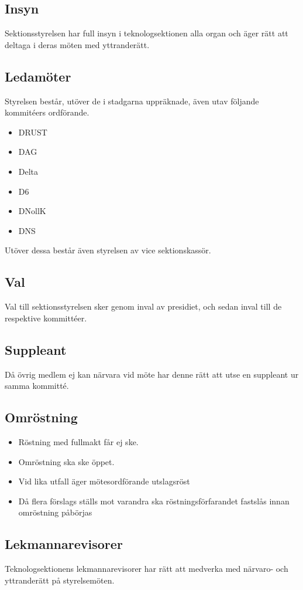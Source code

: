 \subsection{Insyn} 

Sektionsstyrelsen har full insyn i teknologsektionen alla organ och äger rätt att deltaga i deras möten med yttranderätt. 

\subsection{Ledamöter}
Styrelsen består, utöver de i stadgarna uppräknade, även utav följande kommitéers ordförande. 
\begin{itemize}
  \item DRUST 
  \item DAG 
  \item Delta 
  \item D6 
  \item DNollK
  \item DNS
\end{itemize}

Utöver dessa består även styrelsen av vice sektionskassör.

\subsection{Val}
Val till sektionsstyrelsen sker genom inval av presidiet, och sedan inval till de respektive kommittéer.

\subsection{Suppleant}
Då övrig medlem ej kan närvara vid möte har denne rätt att utse en suppleant ur samma kommitté.

\subsection{Omröstning} 

\begin{itemize}
  \item Röstning med fullmakt får ej ske. 
  \item Omröstning ska ske öppet.
  \item Vid lika utfall äger mötesordförande utslagsröst
  \item Då flera förslags ställs mot varandra ska röstningsförfarandet fastslås innan omröstning påbörjas
\end{itemize}

\subsection{Lekmannarevisorer}
Teknologsektionens lekmannarevisorer har rätt att medverka med närvaro-
och yttranderätt på styrelsemöten.
\newpage

